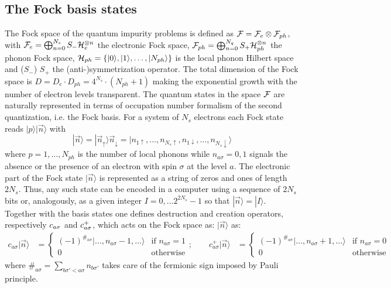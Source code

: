 \documentclass[final,3p,10pt]{elsarticle}
\newcommand{\ket}[1]
{|#1\rangle}
\def\up{\uparrow} \def\down{\downarrow} \def\dw{\downarrow}
\begin{document}
\subsection{The Fock basis states}\label{sSecBasis}
The Fock space of the quantum impurity problems is defined as
${\cal F}={\cal F}_e\otimes {\cal F}_{ph}$, with ${\cal F}_e=\bigoplus_{n=0}^{N_s}
S_-{\cal H}_e^{\otimes n}$ the electronic Fock space,  ${\cal F}_{ph}=\bigoplus_{n=0}^{N_q}S_+{\cal H}_{ph}^{\otimes n}$ the
phonon Fock space,  $\HH_{ph}=\{\ket{0},\ket{1},\dots,\ket{N_{ph}}\}$ is the local phonon Hilbert space
and ($S_-$)  $S_+$ the (anti-)symmetrization operator.  
The total dimension of the Fock space is
$D=D_e\cdot D_{ph}=4^{N_s}\cdot (N_{ph}+1)$ making the exponential
growth with the number of electron levels transparent. 
The quantum states in the space ${\cal F}$ are naturally represented in
terms of occupation number formalism of the second quantization,
i.e. the Fock basis.
For a system of $N_s$ electrons each Fock state
reads $\ket{p}\ket{\vec{n}}$ with
$$
\ket{\vec{n}}=\ket{\vec{n}_\up}{\vec{n}_\dw}=\ket{n_{1\up},\dots,n_{N_s\up},n_{1\dw},\dots,n_{N_s\dw}}
$$ 
where $p=1,\dots,N_{ph}$ is the number of local phonons while $n_{a\sigma}=0,1$ signals the absence or the
presence of an electron with spin $\sigma$ at the level $a$.
The electronic part of the Fock state $\ket{\vec{n}}$ is represented as a string of
zeros and ones of length $2N_s$. Thus, any such state can  be encoded
in a computer using a sequence of $2N_s$ bits or, analogously, as a
given integer $I=0,\dots 2^{2N_s}-1$ so that $\ket{\vec{n}}=\ket{I}$.  
Together with the basis states one defines  destruction and creation 
operators, respectively $c_{a\sigma}$ and $c^+_{a\sigma}$, which acts on the
Fock space as: 
$\ket{\vec{n}}$ as:  
\begin{align*}
  c_{a\sigma}\ket{\vec{n}} &=
    \begin{cases}
      (-1)^{\#_{a\sigma}}\ket{\dots,n_{a\sigma}\!-\!1,\dots}
      &\text{if $n_{a\sigma}\!=\! 1$}\\
      0 &\text{otherwise}
    \end{cases};\qquad
    c^{+}_{a\sigma}\ket{\vec{n}} &=
     \begin{cases}
      (-1)^{\#_{a\sigma}}\ket{\dots,n_{a\sigma}\!+\!1,\dots}
      & \text{if $n_{a\sigma}\!=\! 0$}\\
      0 & \text{otherwise}
    \end{cases}    
\end{align*}
where $\#_{a\sigma}=\sum_{b\sigma'<a\sigma} n_{b\sigma'}$ takes care
of the fermionic sign imposed by Pauli principle. 
\end{document}
